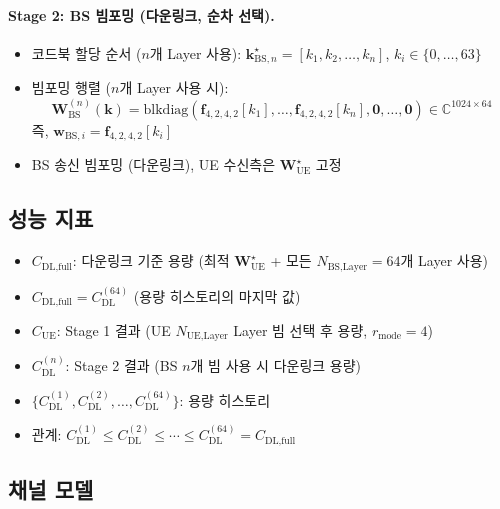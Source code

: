 \documentclass[10pt]{article}
\begin{document}
\paragraph{Stage 2: BS 빔포밍 (다운링크, 순차 선택).}
\begin{itemize}
    \item 코드북 할당 순서 ($n$개 Layer 사용): $\boldsymbol{k}_{\text{BS},n}^{\star} = [k_1, k_2, \ldots, k_n]$, $k_i \in \{0, \ldots, 63\}$
    \item 빔포밍 행렬 ($n$개 Layer 사용 시):
    \begin{equation}
    \mathbf{W}_{\text{BS}}^{(n)}(\mathbf{k}) = \text{blkdiag}(\mathbf{f}_{4,2,4,2}[k_1], \ldots, \mathbf{f}_{4,2,4,2}[k_n], \mathbf{0}, \ldots, \mathbf{0}) \in \mathbb{C}^{1024 \times 64}
    \end{equation}
    즉, $\mathbf{w}_{\text{BS},i} = \mathbf{f}_{4,2,4,2}[k_i]$
    \item BS 송신 빔포밍 (다운링크), UE 수신측은 $\mathbf{W}_{\text{UE}}^{\star}$ 고정
\end{itemize}

\subsection{성능 지표}

\begin{itemize}
    \item $C_{\text{DL,full}}$: 다운링크 기준 용량 (최적 $\mathbf{W}_{\text{UE}}^{\star}$ + 모든 $N_{\text{BS,Layer}}=64$개 Layer 사용)
    \item $C_{\text{DL,full}} = C_{\text{DL}}^{(64)}$ (용량 히스토리의 마지막 값)
    \item $C_{\text{UE}}$: Stage 1 결과 (UE $N_{\text{UE,Layer}}$ Layer 빔 선택 후 용량, $r_{\text{mode}} = 4$)
    \item $C_{\text{DL}}^{(n)}$: Stage 2 결과 (BS $n$개 빔 사용 시 다운링크 용량)
    \item $\{C_{\text{DL}}^{(1)}, C_{\text{DL}}^{(2)}, \ldots, C_{\text{DL}}^{(64)}\}$: 용량 히스토리
    \item 관계: $C_{\text{DL}}^{(1)} \leq C_{\text{DL}}^{(2)} \leq \cdots \leq C_{\text{DL}}^{(64)} = C_{\text{DL,full}}$
\end{itemize}

\subsection{채널 모델}
\end{document}
